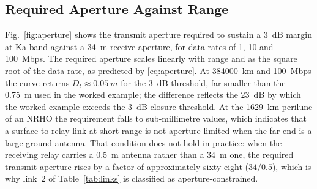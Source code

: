 \documentclass[11pt,a4paper]{article}
\begin{document}
\subsection{Required Aperture Against Range}
Fig.~\ref{fig:aperture} shows the transmit aperture required to sustain a \SI{3}{dB} margin at Ka-band against a \SI{34}{m} receive aperture, for data rates of 1, 10 and \SI{100}{Mbps}. The required aperture scales linearly with range and as the square root of the data rate, as predicted by \eqref{eq:aperture}. At \SI{384000}{km} and \SI{100}{Mbps} the curve returns $D_t \approx \SI{0.05}{m}$ for the \SI{3}{dB} threshold, far smaller than the \SI{0.75}{m} used in the worked example; the difference reflects the \SI{23}{dB} by which the worked example exceeds the \SI{3}{dB} closure threshold. At the \SI{1629}{km} perilune of an NRHO the requirement falls to sub-millimetre values, which indicates that a surface-to-relay link at short range is not aperture-limited when the far end is a large ground antenna. That condition does not hold in practice: when the receiving relay carries a \SI{0.5}{m} antenna rather than a \SI{34}{m} one, the required transmit aperture rises by a factor of approximately sixty-eight ($34/0.5$), which is why link~2 of Table~\ref{tab:links} is classified as aperture-constrained.
\end{document}
